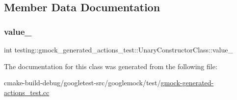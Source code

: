 \subsection{Member Data Documentation}
\mbox{\label{classtesting_1_1gmock__generated__actions__test_1_1UnaryConstructorClass_a5e96ce337c5eb7016eba2ea66ae46851}} 
\subsubsection{\texorpdfstring{value\_}{value\_}}
{\footnotesize\ttfamily int testing\+::gmock\+\_\+generated\+\_\+actions\+\_\+test\+::\+Unary\+Constructor\+Class\+::value\+\_\+}



The documentation for this class was generated from the following file\+:\begin{DoxyCompactItemize}
\item 
cmake-\/build-\/debug/googletest-\/src/googlemock/test/\mbox{\hyperlink{gmock-generated-actions__test_8cc}{gmock-\/generated-\/actions\+\_\+test.\+cc}}\end{DoxyCompactItemize}
